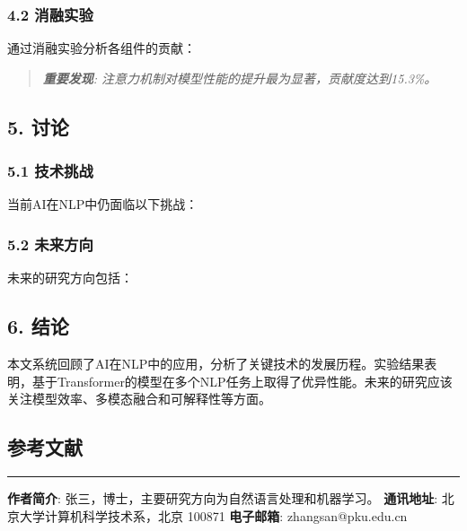 \documentclass[UTF8, a4paper, 11pt]{ctexart}
\begin{document}
\subsubsection{4.2 消融实验}


通过消融实验分析各组件的贡献：


\begin{quote}
\itshape 
\textbf{重要发现}: 注意力机制对模型性能的提升最为显著，贡献度达到15.3\%。

\end{quote}


\subsection{5. 讨论}


\subsubsection{5.1 技术挑战}


当前AI在NLP中仍面临以下挑战：

\subsubsection{5.2 未来方向}


未来的研究方向包括：

\subsection{6. 结论}


本文系统回顾了AI在NLP中的应用，分析了关键技术的发展历程。实验结果表明，基于Transformer的模型在多个NLP任务上取得了优异性能。未来的研究应该关注模型效率、多模态融合和可解释性等方面。


\subsection{参考文献}

\noindent\rule{\textwidth}{1pt}

\textbf{作者简介}: 张三，博士，主要研究方向为自然语言处理和机器学习。 \textbf{通讯地址}: 北京大学计算机科学技术系，北京 100871 \textbf{电子邮箱}: zhangsan@pku.edu.cn
\end{document}
